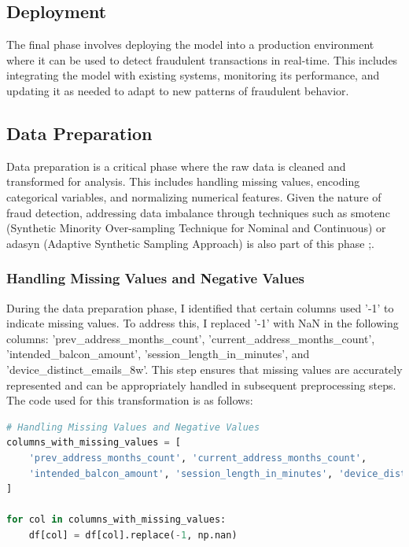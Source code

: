 \documentclass[12pt,a4paper]{report}
\begin{document}
\subsection{Deployment}
The final phase involves deploying the model into a production environment where it can be used to detect fraudulent transactions in real-time. This includes integrating the model with existing systems, monitoring its performance, and updating it as needed to adapt to new patterns of fraudulent behavior.




\subsection{Data Preparation}
Data preparation is a critical phase where the raw data is cleaned and transformed for analysis. This includes handling missing values, encoding categorical variables, and normalizing numerical features. Given the nature of fraud detection, addressing data imbalance through techniques such as \acrshort{smotenc} (Synthetic Minority Over-sampling Technique for Nominal and Continuous) or \acrshort{adasyn} (Adaptive Synthetic Sampling Approach) is also part of this phase \citep{chawla2002smote};\citep{he2008adasyn}.\\

\subsubsection{Handling Missing Values and Negative Values}
During the data preparation phase, I identified that certain columns used '-1' to indicate missing values. To address this, I replaced '-1' with NaN in the following columns: 'prev\_address\_months\_count', 'current\_address\_months\_count', 'intended\_balcon\_amount', 'session\_length\_in\_minutes', and 'device\_distinct\_emails\_8w'. This step ensures that missing values are accurately represented and can be appropriately handled in subsequent preprocessing steps. The code used for this transformation is as follows:

\begin{lstlisting}[language=Python, caption=Handling Missing Values and Negative Values]
# Handling Missing Values and Negative Values
columns_with_missing_values = [
    'prev_address_months_count', 'current_address_months_count', 
    'intended_balcon_amount', 'session_length_in_minutes', 'device_distinct_emails_8w'
]

for col in columns_with_missing_values:
    df[col] = df[col].replace(-1, np.nan)
\end{lstlisting}
\end{document}
